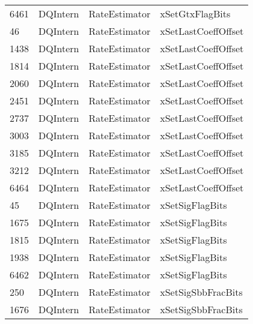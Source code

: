 \begin{tabular}{llll}
6461 &              DQIntern &              RateEstimator &                           xSetGtxFlagBits \\
46   &              DQIntern &              RateEstimator &                       xSetLastCoeffOffset \\
1438 &              DQIntern &              RateEstimator &                       xSetLastCoeffOffset \\
1814 &              DQIntern &              RateEstimator &                       xSetLastCoeffOffset \\
2060 &              DQIntern &              RateEstimator &                       xSetLastCoeffOffset \\
2451 &              DQIntern &              RateEstimator &                       xSetLastCoeffOffset \\
2737 &              DQIntern &              RateEstimator &                       xSetLastCoeffOffset \\
3003 &              DQIntern &              RateEstimator &                       xSetLastCoeffOffset \\
3185 &              DQIntern &              RateEstimator &                       xSetLastCoeffOffset \\
3212 &              DQIntern &              RateEstimator &                       xSetLastCoeffOffset \\
6464 &              DQIntern &              RateEstimator &                       xSetLastCoeffOffset \\
45   &              DQIntern &              RateEstimator &                           xSetSigFlagBits \\
1675 &              DQIntern &              RateEstimator &                           xSetSigFlagBits \\
1815 &              DQIntern &              RateEstimator &                           xSetSigFlagBits \\
1938 &              DQIntern &              RateEstimator &                           xSetSigFlagBits \\
6462 &              DQIntern &              RateEstimator &                           xSetSigFlagBits \\
250  &              DQIntern &              RateEstimator &                        xSetSigSbbFracBits \\
1676 &              DQIntern &              RateEstimator &                        xSetSigSbbFracBits \\

\end{tabular}
